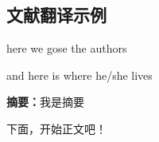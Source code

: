 \begin{Abstract}
\chapter*{文献翻译示例}
\begin{center}
\vspace{2mm}
{
 {\xiaosi here we gose the authors}

 {\xiaowu and here is where he/she lives}
}
\end{center}
{\wuhao \songti 
\noindent \textbf{摘要：}我是摘要

}
\end{Abstract}

下面，开始正文吧！
%
%
%
